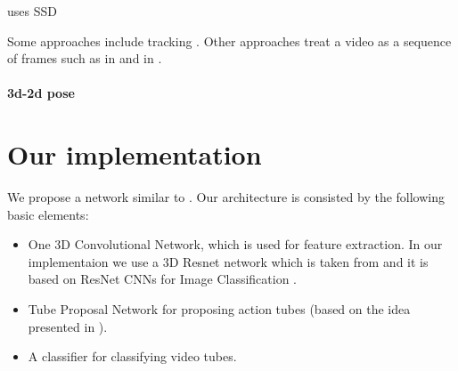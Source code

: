 
\cite{singh2016online} uses SSD 

Some approaches include tracking \cite{DBLP:journals/corr/WeinzaepfelHS15}.
Other approaches treat a video as a sequence of frames such as in \cite{DBLP:journals/corr/KalogeitonWFS17} and in \cite{DBLP:journals/corr/HouCS17}.

\paragraph{3d-2d pose}







\section{Our implementation}
We propose a network similar to \cite{DBLP:journals/corr/HouCS17}. Our architecture is consisted by the following basic elements:
\begin{itemize}
\item One 3D Convolutional Network, which is used for feature extraction. In our implementaion we use a 3D Resnet network which is taken from
  \cite{hara3dcnns} and it is based on ResNet CNNs for Image Classification \cite{DBLP:journals/corr/HeZRS15}.
\item Tube Proposal Network for proposing action tubes (based on the idea presented in \cite{DBLP:journals/corr/HouCS17}).
\item A classifier for classifying video tubes.
\end{itemize}
  



% 